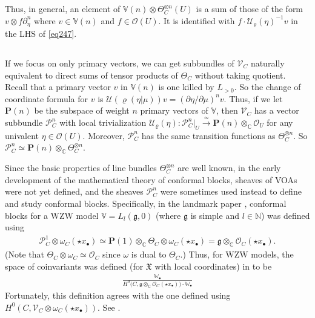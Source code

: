 \documentclass[11pt,b5paper,notitlepage]{article}
\theoremstyle{definition}
\theoremstyle{plain}
\newcommand{\fk}{\mathfrak}
\newcommand{\mc}{\mathcal}
\newcommand{\scr}{\mathscr}
\newcommand{\gk}{\mathfrak g}
\newcommand{\mbf}{\mathbf}
\newcommand{\blt}{\bullet}
\newcommand{\Vbb}{\mathbb V}
\newcommand{\Wbb}{\mathbb W}
\newcommand{\Cbb}{\mathbb C}
\newcommand{\Nbb}{\mathbb N}
\numberwithin{equation}{section}
\begin{document}
Thus, in general, an element of $\Vbb(n)\otimes\Theta_C^{\otimes n}(U)$ is a sum of those of the form $v\otimes f\partial_\eta^n$ where $v\in\Vbb(n)$ and $f\in\scr O(U)$. It is identified with $f\cdot \mc U_\varrho(\eta)^{-1}v$ in the LHS of \eqref{eq247}.

\subsection{}

If we focus on only primary vectors, we can get subbundles of $\scr V_C$ naturally equivalent to direct sums of tensor products of $\Theta_C$ without taking quotient. Recall that a primary vector $v$ in $\Vbb(n)$ is  one killed by $L_{>0}$.  So the change of coordinate formula for $v$ is $\mc U(\varrho(\eta|\mu))v=(\partial\eta/\partial\mu)^nv$. Thus, if we let $\mbf P(n)$ be the subspace of weight $n$ primary vectors of $\Vbb$, then $\scr V_C$ has a vector subbundle $\scr P^n_C$ with local trivialization $\mc U_\varrho(\eta):\scr P^n_C|_U\xrightarrow{\simeq} \mbf P(n)\otimes_\Cbb\scr O_U$ for any univalent $\eta\in\scr O(U)$. Moreover, $\scr P_C^n$ has the same transition functions as $\Theta_C^{\otimes n}$. So $\scr P_C^n\simeq \mbf P(n)\otimes_\Cbb\Theta_C^{\otimes n}$.





Since the basic properties of line bundles $\Theta_C^{\otimes n}$ are well known, in the early development of the mathematical theory of conformal blocks, sheaves of VOAs were not yet defined, and the sheaves $\scr P^n_C$ were sometimes used instead to define and study conformal blocks. Specifically, in the landmark paper \cite{TUY89}, conformal blocks for a WZW model $\Vbb=L_l(\gk,0)$ (where $\gk$ is simple and $l\in\Nbb$) was defined using
\begin{align*}
\scr P^1_C\otimes \omega_C(\star x_\blt)\simeq\mbf P(1)\otimes_\Cbb \Theta_C\otimes\omega_C(\star x_\blt)=\gk\otimes_\Cbb\scr O_C(\star x_\blt).
\end{align*}
(Note that $\Theta_C\otimes\omega_C\simeq\scr O_C$ since $\omega$ is dual to $\Theta_C$.) Thus, for WZW models, the space of coinvariants was defined (for $\fk X$ with local coordinates) in \cite{TUY89} to be
\begin{align*}
\frac{\Wbb_\blt}{H^0\big(C,\gk\otimes_\Cbb\scr O_C(\star x_\blt)\big)\cdot\Wbb_\blt}
\end{align*}
Fortunately, this definition agrees with the one defined using $H^0(C,\scr V_C\otimes\omega_C(\star x_\blt))$. See \cite[Sec. 9.3]{FB04}.
\end{document}
